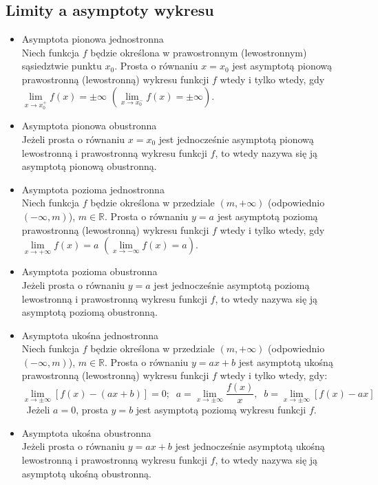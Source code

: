 \documentclass[14pt,a4paper]{extarticle}
\begin{document}
\subsection{Limity a asymptoty wykresu}
\begin{itemize}
   \item Asymptota pionowa jednostronna\\
   Niech funkcja $f$ będzie określona w prawostronnym (lewostronnym) sąsiedztwie punktu $x_{0}$.
   Prosta o równaniu $x = x_{0}$ jest asymptotą pionową prawostronną (lewostronną) wykresu funkcji $f$
   wtedy i tylko wtedy, gdy $\lim\limits_{x \to x^{+}_{0}}f(x) = \pm\infty$ $\left(\lim\limits_{x \to x^{-}_{0}}f(x) = \pm\infty\right)$.\\
   \item Asymptota pionowa obustronna\\
   Jeżeli prosta o równaniu $x = x_{0}$ jest jednocześnie asymptotą pionową lewostronną i prawostronną
   wykresu funkcji $f$, to wtedy nazywa się ją asymptotą pionową obustronną.\\
   \item Asymptota pozioma jednostronna\\
   Niech funkcja $f$ będzie określona w przedziale $(m, +\infty)$ (odpowiednio $(-\infty, m)$), $m \in \mathbb{R}$.
   Prosta o równaniu $y = a$ jest asymptotą poziomą prawostronną (lewostronną) wykresu funkcji $f$ 
   wtedy i tylko wtedy, gdy $\lim\limits_{x\to +\infty}f(x) = a$ $\left(\lim\limits_{x\to -\infty}f(x) = a\right)$.\\
   \item Asymptota pozioma obustronna\\
   Jeżeli prosta o równaniu $y = a$ jest jednocześnie asymptotą poziomą lewostronną i prawostronną
   wykresu funkcji $f$, to wtedy nazywa się ją asymptotą poziomą obustronną.\\
   \item Asymptota ukośna jednostronna\\
   Niech funkcja $f$ będzie określona w przedziale $(m, +\infty)$ (odpowiednio $(-\infty, m)$), $m \in \mathbb{R}$.
   Prosta o równaniu $y = ax + b$ jest asymptotą ukośną prawostronną (lewostronną) wykresu funkcji $f$
   wtedy i tylko wtedy, gdy:
   $$\lim_{x \to \pm\infty}\left[f(x) - (ax + b)\right] = 0; \;\; a = \lim_{x \to \pm\infty}\frac{f(x)}{x}, \;\; b = \lim_{x \to \pm\infty}\left[f(x) - ax\right]$$\
   Jeżeli $a = 0$, prosta $y = b$ jest asymptotą poziomą wykresu funkcji $f$.\\
   \item Asymptota ukośna obustronna\\
   Jeżeli prosta o równaniu $y = ax + b$ jest jednocześnie asymptotą ukośną lewostronną i prawostronną
   wykresu funkcji $f$, to wtedy nazywa się ją asymptotą ukośną obustronną.\\
\end{itemize}
\end{document}
